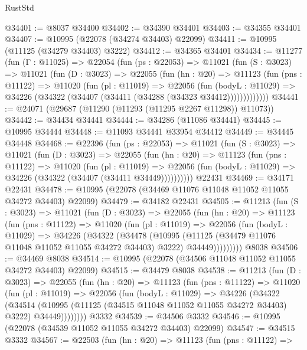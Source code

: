 \begin{lexlean}{RustStd}
\begin{coremodule}
@34401 := @8037 @34400
@34402 := @34390 @34401
@34403 := @34355 @34401
@34407 := @10995 (@22078 (@34274 @34403) @22099)
@34411 := @10995 (@11125 (@34279 @34403) @3222)
@34412 := @34365 @34401
@34434 := @11277
    (fun (Γ : @11025) =>
    @22054
      (fun (ps : @22053) =>
      @11021
        (fun (S : @3023) =>
        @11021
          (fun (D : @3023) =>
          @22055
            (fun (hn : @20) =>
            @11123
              (fun (pns : @11122) =>
              @11020
                (fun (pl : @11019) =>
                @22056
                  (fun (bodyL : @11029) =>
                  @34226 (@34322 (@34407 (@34411 (@34288 (@34323 @34412)))))))))))))
@34441 := @24071 (@29687 (@11290 (@11293 (@11295 @2267 @11298)) @11073))
@34442 := @34434 @34441
@34444 := @34286 (@11086 @34441)
@34445 := @10995 @34444
@34448 := @11093 @34441 @33954 @34412
@34449 := @34445 @34448
@34468 := @22396
    (fun (ps : @22053) =>
    @11021
      (fun (S : @3023) =>
      @11021
        (fun (D : @3023) =>
        @22055
          (fun (hn : @20) =>
          @11123
            (fun (pns : @11122) =>
            @11020
              (fun (pl : @11019) =>
              @22056 (fun (bodyL : @11029) => @34226 (@34322 (@34407 (@34411 @34449))))))))))
    @22431
@34469 := @34171 @22431
@34478 := @10995 (@22078 (@34469 @11076 @11048 @11052 @11055 @34272 @34403) @22099)
@34479 := @34182 @22431
@34505 := @11213
    (fun (S : @3023) =>
    @11021
      (fun (D : @3023) =>
      @22055
        (fun (hn : @20) =>
        @11123
          (fun (pns : @11122) =>
          @11020
            (fun (pl : @11019) =>
            @22056
              (fun (bodyL : @11029) =>
              @34226
                (@34322
                  (@34478
                    (@10995
                      (@11125 (@34479 @11076 @11048 @11052 @11055 @34272 @34403) @3222)
                      @34449)))))))))
    @8038
@34506 := @34469 @8038
@34514 := @10995 (@22078 (@34506 @11048 @11052 @11055 @34272 @34403) @22099)
@34515 := @34479 @8038
@34538 := @11213
    (fun (D : @3023) =>
    @22055
      (fun (hn : @20) =>
      @11123
        (fun (pns : @11122) =>
        @11020
          (fun (pl : @11019) =>
          @22056
            (fun (bodyL : @11029) =>
            @34226
              (@34322
                (@34514
                  (@10995 (@11125 (@34515 @11048 @11052 @11055 @34272 @34403) @3222) @34449))))))))
    @3332
@34539 := @34506 @3332
@34546 := @10995 (@22078 (@34539 @11052 @11055 @34272 @34403) @22099)
@34547 := @34515 @3332
@34567 := @22503
    (fun (hn : @20) =>
    @11123
      (fun (pns : @11122) =>

\end{coremodule}
\end{lexlean}
